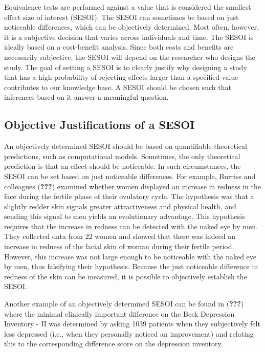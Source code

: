\documentclass[english,man]{apa6}
\theoremstyle{definition}
\theoremstyle{definition}
\theoremstyle{definition}
\theoremstyle{remark}
\begin{document}
Equivalence tests are performed against a value that is considered the
smallest effect size of interest (SESOI). The SESOI can sometimes be
based on just noticeable differences, which can be objectively
determined. Most often, however, it is a subjective decision that varies
across individuals and time. The SESOI is ideally based on a
cost-benefit analysis. Since both costs and benefits are necessarily
subjective, the SESOI will depend on the researcher who designs the
study. The goal of setting a SESOI is to clearly justify why designing a
study that has a high probability of rejecting effects larger than a
specified value contributes to our knowledge base. A SESOI should be
chosen such that inferences based on it answer a meaningful question.

\subsection{Objective Justifications of a
SESOI}\label{objective-justifications-of-a-sesoi}

An objectively determined SESOI should be based on quantifiable
theoretical predictions, such as computational models. Sometimes, the
only theoretical prediction is that an effect should be noticeable. In
such circumstances, the SESOI can be set based on just noticeable
differences. For example, Burriss and colleagues ({\textbf{???}})
examined whether women displayed an increase in redness in the face
during the fertile phase of their ovulatory cycle. The hypothesis was
that a slightly redder skin signals greater attractiveness and physical
health, and sending this signal to men yields an evolutionary advantage.
This hypothesis requires that the increase in redness can be detected
with the naked eye by men. They collected data from 22 women and showed
that there was indeed an increase in redness of the facial skin of woman
during their fertile period. However, this increase was not large enough
to be noticeable with the naked eye by men, thus falsifying their
hypothesis. Because the just noticeable difference in redness of the
skin can be measured, it is possible to objectively establish the SESOI.

Another example of an objectively determined SESOI can be found in
({\textbf{???}}) where the minimal clinically important difference on
the Beck Depression Inventory - II was determined by asking 1039
patients when they subjectively felt less depressed (i.e., when they
personally noticed an improvement) and relating this to the
corresponding difference score on the depression inventory.
\end{document}
